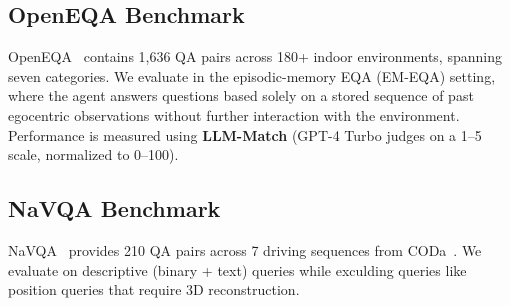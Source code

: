 \subsection{OpenEQA Benchmark}
OpenEQA~\cite{majumdar2024openeqa} contains 1,636 QA pairs across 180+ indoor environments, spanning seven categories.
We evaluate in the episodic-memory EQA (EM-EQA) setting, where the agent answers questions based solely on a stored sequence of past egocentric observations without further interaction with the environment. Performance is measured using \textbf{LLM-Match} (GPT-4 Turbo judges on a 1--5 scale, normalized to 0--100). 

\subsection{NaVQA Benchmark}
NaVQA~\cite{anwar2024remembr} provides 210 QA pairs across 7 driving sequences from CODa~\cite{zhang2024toward}.
We evaluate on descriptive (binary + text) queries while exculding queries like position queries that require 3D reconstruction.
